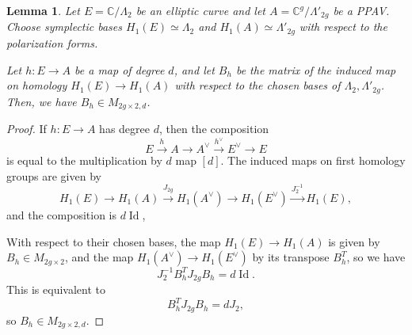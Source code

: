 \documentclass[12pt]{amsart}
\def\bC{\mathbb{C}}
\DeclareMathOperator{\Id}{Id}
\newtheorem{lem}[thm]{Lemma}
\theoremstyle{definition}
\begin{document}
\begin{lem}\label{lem:B_discriminant}
Let $E=\bC/\Lambda_2$ be an elliptic curve and let $A=\bC^g/\Lambda'_{2g}$ be a PPAV. Choose symplectic bases $H_1(E)\simeq \Lambda_{2}$ and $H_1(A)\simeq \Lambda'_{2g}$ with respect to the polarization forms.

Let $h:E\to A$ be a map of degree $d$, and let $B_h$ be the matrix of the induced map on homology $H_1(E)\to H_1(A)$ with respect to the chosen bases of $\Lambda_2,\Lambda'_{2g}$. Then, we have $B_h\in M_{2g\times 2,d}$.
\end{lem}

\begin{proof}
If $h:E\to A$ has degree $d$, then the composition 
\begin{equation*}
    E \overset{h}\longrightarrow A \to A^\vee \overset{h^\vee}\longrightarrow E^\vee \to E
\end{equation*}
is equal to the multiplication by $d$ map $[d]$. The induced maps on first homology groups are given by
\begin{equation*}
H_1(E)\to H_1(A) \overset{J_{2g}}\longrightarrow H_1(A^\vee) \to H_1(E^\vee) \overset{J_2^{-1}}\longrightarrow H_1(E),
\end{equation*}
and the composition is $d\Id$,

With respect to their chosen bases, the map $H_1(E) \to H_1(A)$ is given by $B_h\in M_{2g\times 2}$, and the map $H_1(A^\vee) \to H_1(E^\vee)$ by its transpose $B_h^T$, so we have
\begin{equation*}
J_2^{-1} B_h^T J_{2g} B_h = d\Id.
\end{equation*}
This is equivalent to
\begin{equation*}
B_h^T J_{2g} B_h = dJ_2,
\end{equation*}
so $B_h\in M_{2g\times 2, d}$.
\end{proof}
\end{document}
